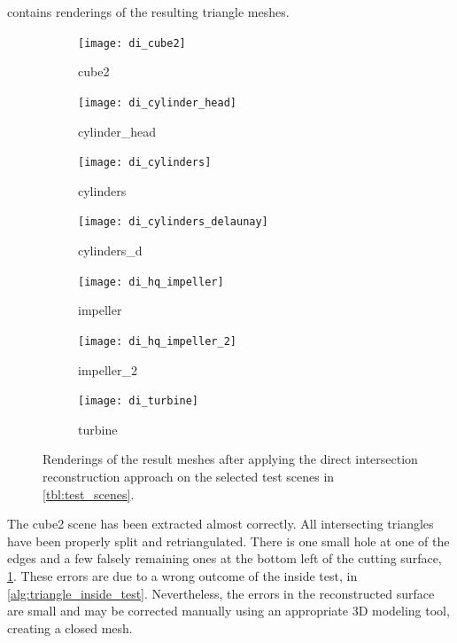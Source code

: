  contains renderings of the resulting triangle meshes.
%
\begin{figure}
	\centering
	\begin{subfigure}[b]{0.34\textwidth}
		\centering
		\texttt{[image: di\_cube2]}
		\caption{cube2}
		\label{fig:di_cube2}
	\end{subfigure}
	\hspace{1cm}
	\begin{subfigure}[b]{0.34\textwidth}
		\centering
		\texttt{[image: di\_cylinder\_head]}
		\caption{cylinder\_head}
		\label{fig:di_cylinder_head}
	\end{subfigure}
	\begin{subfigure}[b]{0.34\textwidth}
		\centering
		\texttt{[image: di\_cylinders]}
		\caption{cylinders}
		\label{fig:di_cylinders}
	\end{subfigure}
	\hspace{1cm}
	\begin{subfigure}[b]{0.34\textwidth}
		\centering
		\texttt{[image: di\_cylinders\_delaunay]}
		\caption{cylinders\_d}
		\label{fig:di_cylinders_d}
	\end{subfigure}
	\begin{subfigure}[b]{0.34\textwidth}
		\centering
		\texttt{[image: di\_hq\_impeller]}
		\caption{impeller}
		\label{fig:di_impeller}
	\end{subfigure}
	\hspace{1cm}
	\begin{subfigure}[b]{0.34\textwidth}
		\centering
		\texttt{[image: di\_hq\_impeller\_2]}
		\caption{impeller\_2}
		\label{fig:di_impeller_2}
	\end{subfigure}
	\begin{subfigure}[b]{0.33\textwidth}
		\centering
		\texttt{[image: di\_turbine]}
		\caption{turbine}
		\label{fig:di_turbine}
	\end{subfigure}
	\caption{
		Renderings of the result meshes after applying the direct intersection reconstruction approach on the selected test scenes in \cref{tbl:test_scenes}.
	}
	\label{fig:di_results}
\end{figure}
%
The cube2 scene has been extracted almost correctly.
All intersecting triangles have been properly split and retriangulated.
There is one small hole at one of the edges and a few falsely remaining ones at the bottom left of the cutting surface, \cf \cref{fig:di_cube2}.
These errors are due to a wrong outcome of the inside test, \cf {} in \cref{alg:triangle_inside_test}.
Nevertheless, the errors in the reconstructed surface are small and may be corrected manually using an appropriate 3D modeling tool, creating a closed mesh.

